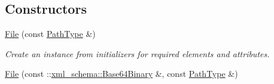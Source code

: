 \subsection*{Constructors}
\begin{DoxyCompactItemize}
\item 
\hypertarget{classopenstack_1_1xml_1_1File_ab4769b67b46bbfdcf53a455e488c6b3f}{
\hyperlink{classopenstack_1_1xml_1_1File_ab4769b67b46bbfdcf53a455e488c6b3f}{File} (const \hyperlink{classopenstack_1_1xml_1_1FileName}{PathType} \&)}
\label{classopenstack_1_1xml_1_1File_ab4769b67b46bbfdcf53a455e488c6b3f}

\begin{DoxyCompactList}\small\item\em Create an instance from initializers for required elements and attributes. \item\end{DoxyCompactList}\item 
\hypertarget{classopenstack_1_1xml_1_1File_a6e469a443cc5b6b65eb559ff5f810b99}{
\hyperlink{classopenstack_1_1xml_1_1File_a6e469a443cc5b6b65eb559ff5f810b99}{File} (const ::\hyperlink{namespacexml__schema_a439c138de03306df7e07a447abfe54ed}{xml\_\-schema::Base64Binary} \&, const \hyperlink{classopenstack_1_1xml_1_1FileName}{PathType} \&)}
\label{classopenstack_1_1xml_1_1File_a6e469a443cc5b6b65eb559ff5f810b99}


\end{DoxyCompactItemize}
